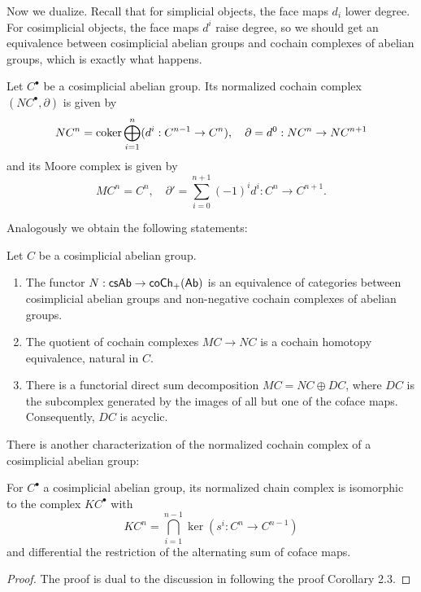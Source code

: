 Now we dualize. Recall that for simplicial objects, the face maps $d_i$ lower degree. For cosimplicial objects, the face maps $d^i$ raise degree, so we should get an equivalence between cosimplicial abelian groups and cochain complexes of abelian groups, which is exactly what happens.
\begin{defn}
  Let $C^\bullet$ be a cosimplicial abelian group. Its normalized cochain complex $(NC^\bullet, \partial)$ is given by 
  \[NC^n = \operatorname{coker}\bigoplus_{i=1}^{n} (d^i: C^{n-1}\to C^n), \quad \partial = d^0: NC^n \to NC^{n+1}\]
  and its Moore complex is given by 
  \[MC^n = C^n, \quad \partial' = \sum_{i=0}^{n+1} (-1)^i d^i: C^n\to C^{n+1}.\]
\end{defn}
Analogously we obtain the following statements:
\begin{thm} Let $C$ be a cosimplicial abelian group.
  \begin{enumerate}
    \item The functor $N: \mathsf{csAb} \to \mathsf{coCh_+(Ab)}$ is an equivalence of categories between cosimplicial abelian groups and non-negative cochain complexes of abelian groups.
    \item The quotient of cochain complexes $MC \rightarrow NC$ is a cochain homotopy equivalence, natural in $C$.
    \item There is a functorial direct sum decomposition $MC = NC \oplus DC$, where $DC$ is the subcomplex generated by the images of all but one of the coface maps. Consequently, $DC$ is acyclic.
  \end{enumerate}
\end{thm}
\noindent There is another characterization of the normalized cochain complex of a cosimplicial abelian group:
\begin{lem}
  For $C^\bullet$ a cosimplicial abelian group, its normalized chain complex is isomorphic to the complex $KC^\bullet$ with 
  \[KC^n = \bigcap_{i=1}^{n-1}\ker(s^i: C^n\to C^{n-1})\]
  and differential the restriction of the alternating sum of coface maps.
  \begin{proof}
    The proof is dual to the discussion in \cite{Goerss2009} following the proof Corollary 2.3.
  \end{proof}
\end{lem}

